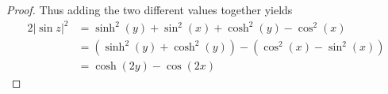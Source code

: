 \documentclass{article}
\begin{document}
\begin{proof}
  Thus adding the two different values together yields \begin{align*}
    2|\sin z|^2 &= \sinh^2(y) + \sin^2(x) + \cosh^2(y) - \cos^2(x) \\
    &= (\sinh^2(y) + \cosh^2(y)) - (\cos^2(x) - \sin^2(x)) \\
    &= \cosh(2y) - \cos(2x)
  \end{align*}
\end{proof}
\end{document}
